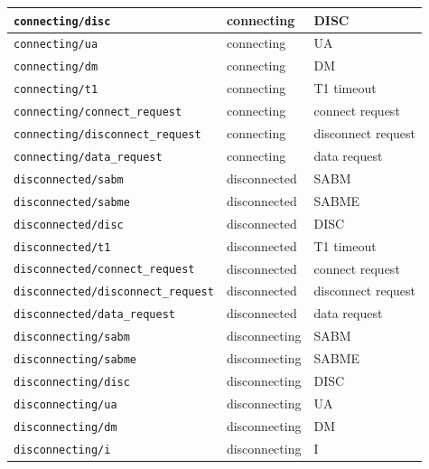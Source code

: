 \documentclass[a4paper]{article}
\begin{document}
{\begin{center}
\begin{tabular}[h]{|l|l|l|}
        \verb'connecting/disc' & connecting    & DISC                \\
        \hline
        \verb'connecting/ua' & connecting    & UA                  \\
        \hline
        \verb'connecting/dm' & connecting    & DM                  \\
        \hline
        \verb'connecting/t1' & connecting    & T1 timeout          \\
        \hline
        \verb'connecting/connect_request' & connecting    & connect request     \\
        \hline
        \verb'connecting/disconnect_request' & connecting    & disconnect request  \\
        \hline
        \verb'connecting/data_request' & connecting    & data request        \\
        \hline
        \verb'disconnected/sabm' & disconnected  & SABM                \\
        \hline
        \verb'disconnected/sabme' & disconnected  & SABME               \\
        \hline
        \verb'disconnected/disc' & disconnected  & DISC                \\
        \hline
        \verb'disconnected/t1' & disconnected  & T1 timeout          \\
        \hline
        \verb'disconnected/connect_request' & disconnected  & connect request     \\
        \hline
        \verb'disconnected/disconnect_request' & disconnected  & disconnect request  \\
        \hline
        \verb'disconnected/data_request' & disconnected  & data request        \\
        \hline
        \verb'disconnecting/sabm' & disconnecting & SABM                \\
        \hline
        \verb'disconnecting/sabme' & disconnecting & SABME               \\
        \hline
        \verb'disconnecting/disc' & disconnecting & DISC                \\
        \hline
        \verb'disconnecting/ua' & disconnecting & UA                  \\
        \hline
        \verb'disconnecting/dm' & disconnecting & DM                  \\
        \hline
        \verb'disconnecting/i' & disconnecting & I                   \\

\end{tabular}
\end{center}}
\end{document}
